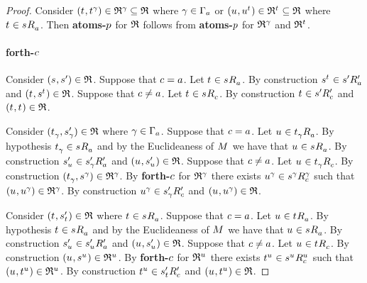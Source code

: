 \begin{proof}
Consider $(\kStateT, \kStateT[\gamma]) \in \refinement^\gamma \subseteq \refinement$ where $\gamma \in \Gamma_\agentA$ or $(\kStateU, \kStateU[\kStateT]) \in \refinement^{\kStateT} \subseteq \refinement$ where $\kStateT \in \kSuccessorsA{\kStateS}$.
Then {\bf atoms-$\atomP$} for $\refinement$ follows from {\bf atoms-$\atomP$} for $\refinement^\gamma$ and $\refinement^{\kStateT}$.

\paragraph{forth-$\agentC$}
Consider $(\kStateS, \kStateSP) \in \refinement$.
Suppose that $\agentC = \agentA$.
Let $\kStateT \in \kSuccessorsA{\kStateS}$.
By construction $\kStateS[\kStateT] \in \kSuccessorsPA{\kStateSP}$ and $(\kStateT, \kStateS[\kStateT]) \in \refinement$.
Suppose that $\agentC \neq \agentA$.
Let $\kStateT \in \kSuccessorsC{\kStateS}$.
By construction $\kStateT \in \kSuccessorsPC{\kStateSP}$ and $(\kStateT, \kStateT) \in \refinement$.

Consider $(\kStateT_\gamma, \kStateSP_\gamma) \in \refinement$ where $\gamma \in \Gamma_\agentA$.
Suppose that $\agentC = \agentA$.
Let $\kStateU \in \kSuccessorsA{\kStateT_\gamma}$.
By hypothesis $\kStateT_\gamma \in \kSuccessorsA{\kStateS}$ and by the Euclideaness of $\kModel$ we have that $\kStateU \in \kSuccessorsA{\kStateS}$.
By construction $\kStateSP_{\kStateU} \in \kSuccessorsPA{\kStateSP_\gamma}$ and $(\kStateU, \kStateSP_{\kStateU}) \in \refinement$.
Suppose that $\agentC \neq \agentA$.
Let $\kStateU \in \kSuccessorsC{\kStateT_\gamma}$.
By construction $(\kStateT_\gamma, \kStateS[\gamma]) \in \refinement^\gamma$.
By {\bf forth-$\agentC$} for $\refinement^\gamma$ there exists $\kStateU[\gamma] \in \kSuccessorsC[\gamma]{\kStateS[\gamma]}$ such that $(\kStateU, \kStateU[\gamma]) \in \refinement^\gamma$.
By construction $\kStateU[\gamma] \in \kSuccessorsPC{\kStateSP_\gamma}$ and $(\kStateU, \kStateU[\gamma]) \in \refinement$.

Consider $(\kStateT, \kStateSP_{\kStateT}) \in \refinement$ where $\kStateT \in \kSuccessorsA{\kStateS}$.
Suppose that $\agentC = \agentA$.
Let $\kStateU \in \kSuccessorsA{\kStateT}$.
By hypothesis $\kStateT \in \kSuccessorsA{\kStateS}$ and by the Euclideaness of $\kModel$ we have that $\kStateU \in \kSuccessorsA{\kStateS}$.
By construction $\kStateSP_{\kStateU} \in \kSuccessorsPA{\kStateSP_{\kStateU}}$ and $(\kStateU, \kStateSP_{\kStateU}) \in \refinement$.
Suppose that $\agentC \neq \agentA$.
Let $\kStateU \in \kSuccessorsC{\kStateT}$.
By construction $(\kStateU, \kStateS[\kStateU]) \in \refinement^{\kStateU}$.
By {\bf forth-$\agentC$} for $\refinement^{\kStateU}$ there exists $\kStateT[\kStateU] \in \kSuccessorsC[\kStateU]{\kStateS[\kStateU]}$ such that $(\kStateU, \kStateT[\kStateU]) \in \refinement^{\kStateU}$.
By construction $\kStateT[\kStateU] \in \kSuccessorsPC{\kStateSP_{\kStateT}}$ and $(\kStateU, \kStateT[\kStateU]) \in \refinement$.


\end{proof}
